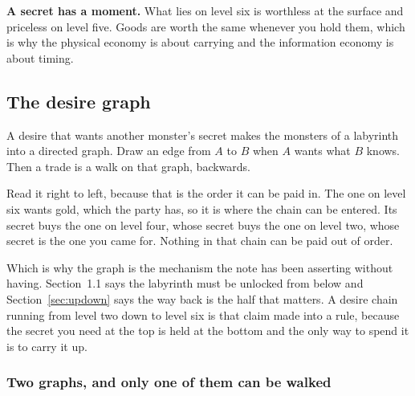\documentclass[11pt,a4paper]{article}
\begin{document}
\textbf{A secret has a moment.} What lies on level six is worthless at the surface and priceless on
level five. Goods are worth the same whenever you hold them, which is why the physical economy is
about carrying and the information economy is about timing.

\subsection{The desire graph}
\label{sec:graph}

A desire that wants another monster's secret makes the monsters of a labyrinth into a directed
graph. Draw an edge from $A$ to $B$ when $A$ wants what $B$ knows. Then a trade is a walk on that
graph, backwards.

\begin{center}
\end{center}

Read it right to left, because that is the order it can be paid in. The one on level six wants gold, which the
party has, so it is where the chain can be entered. Its secret buys the one on level four, whose
secret buys the one on level two, whose secret is the one you came for. Nothing in that chain can be paid out of
order.

\begin{sectionbox}
Which is why the graph is the mechanism the note has been asserting without having. Section~1.1
says the labyrinth must be unlocked from below and Section~\ref{sec:updown} says the way back is
the half that matters. A desire chain running from level two down to level six is that claim made
into a rule, because the secret you need at the top is held at the bottom and the only way to
spend it is to carry it up.
\end{sectionbox}

\subsubsection*{Two graphs, and only one of them can be walked}
\end{document}
